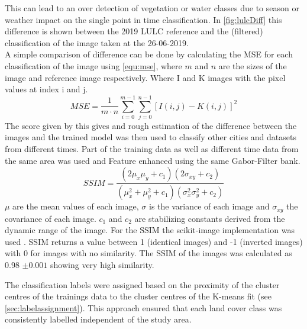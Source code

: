 \documentclass[12pt,a4paper, english,twoside]{scrartcl}
\begin{document}
      This can lead to an over detection of vegetation or water classes due to season or weather impact on the single point in time classification.
      In \cref{fig:lulcDiff} this difference is shown between the 2019 \gls{LULC} reference and the (filtered) classification of the image taken at the 26-06-2019. \\ 
      A simple comparison of difference can be done by calculating the \gls{MSE} for each classification of the image using \cref{equ:mse}, where  $m$ and $n$ are the sizes of the image and reference image respectively. Where I and K images with the pixel values at index i and j. 
      \begin{equation}\label{equ:mse}
      MSE = \frac{1}{m\cdot n} \sum_{i=0}^{m-1} \sum_{j=0}^{n-1} {\left[I\left(i,j\right)-K\left(i,j\right)\right]}^2
      \end{equation}
      The score given by this gives and rough estimation of the difference between the images and the trained model was then used to classify other cities and datasets from different times. 
      Part of the training data as well as different time data from the same area was used and Feature enhanced using the same Gabor-Filter bank.
      \begin{equation}\label{equ:ssim}
      SSIM = \frac{(2\mu_{x}\mu_{y}+c_{1})(2\sigma_{xy}+c_{2})}{(\mu_{x}^2+\mu_{y}^2+c_{1})(\sigma_{x}^2\sigma_{y}^2+c_{2})}
      \end{equation}
      $\mu$ are the mean values of each image, $\sigma$ is the variance of each image and $\sigma_{xy}$ the covariance of each image. $c_{1}$ and $c_{2}$ are stabilizing constants derived from the dynamic range of the image.
      For the SSIM the scikit-image implementation was used \autocite{Walt2014}.
      \Gls{SSIM} returns a value between 1 (identical images) and -1 (inverted images) with 0 for images with no similarity. 
      The \gls{SSIM} of the images was calculated as 0.98 $\pm 0.001$ showing very high similarity.



      \noindent
      The classification labels were assigned based on the proximity of the cluster centres of the trainings data to the cluster centres of the K-means fit (see \cref{sec:labelassignment}).
      This approach ensured that each land cover class was consistently labelled independent of the study area.\\
\end{document}
